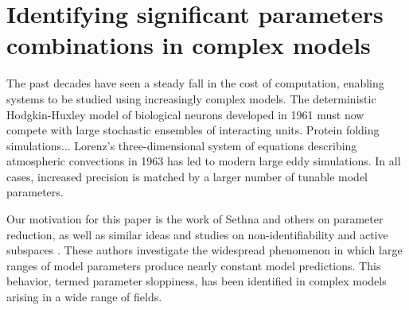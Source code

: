 \chapter{Identifying significant parameters combinations in complex
  models \label{ch:params}}




The past decades have seen a steady fall in the cost of computation,
enabling systems to be studied using increasingly complex models. The
deterministic Hodgkin-Huxley model of biological neurons developed in
1961 must now compete with large stochastic ensembles of interacting
units. Protein folding simulations... Lorenz's three-dimensional
system of equations describing atmospheric convections in 1963 has led
to modern large eddy simulations. In all cases, increased precision is
matched by a larger number of tunable model parameters.

Our motivation for this paper is the work of Sethna and others on
parameter reduction\cite{AS06}, as well as similar ideas and studies
on non-identifiability \cite{RKMBSKT09} and active subspaces
\cite{CDW14}. These authors investigate the widespread phenomenon in
which large ranges of model parameters produce nearly constant model
predictions. This behavior, termed parameter sloppiness, has been
identified in complex models arising in a wide range of fields.

